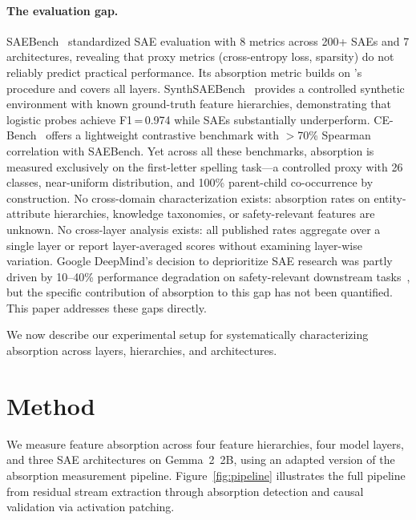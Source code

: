 \documentclass{article}
\begin{document}
\paragraph{The evaluation gap.} SAEBench~\citep{karvonen2025saebench} standardized SAE evaluation with 8 metrics across 200+ SAEs and 7 architectures, revealing that proxy metrics (cross-entropy loss, sparsity) do not reliably predict practical performance. Its absorption metric builds on \citet{chanin2024absorption}'s procedure and covers all layers. SynthSAEBench~\citep{synthsaebench2026} provides a controlled synthetic environment with known ground-truth feature hierarchies, demonstrating that logistic probes achieve F1\,=\,0.974 while SAEs substantially underperform. CE-Bench~\citep{gulko2025cebench} offers a lightweight contrastive benchmark with $>$70\% Spearman correlation with SAEBench. Yet across all these benchmarks, absorption is measured exclusively on the first-letter spelling task---a controlled proxy with 26 classes, near-uniform distribution, and 100\% parent-child co-occurrence by construction. No cross-domain characterization exists: absorption rates on entity-attribute hierarchies, knowledge taxonomies, or safety-relevant features are unknown. No cross-layer analysis exists: all published rates aggregate over a single layer or report layer-averaged scores without examining layer-wise variation. Google DeepMind's decision to deprioritize SAE research was partly driven by 10--40\% performance degradation on safety-relevant downstream tasks~\citep{smith2025safety}, but the specific contribution of absorption to this gap has not been quantified. This paper addresses these gaps directly.

We now describe our experimental setup for systematically characterizing absorption across layers, hierarchies, and architectures.

\section{Method}
\label{sec:method}

We measure feature absorption across four feature hierarchies, four model layers, and three SAE architectures on Gemma~2~2B, using an adapted version of the \citet{chanin2024absorption} absorption measurement pipeline. Figure~\ref{fig:pipeline} illustrates the full pipeline from residual stream extraction through absorption detection and causal validation via activation patching.
\end{document}
